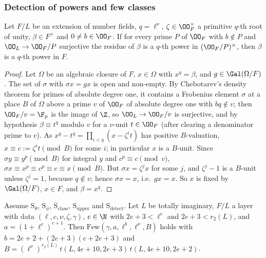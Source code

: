 \subsubsection{Detection of powers and few classes}

\begin{proposition}\label{pf:vwin:sdetect}
Let $F/L$ be an extension of number fields, $q=\ell^\nu$, $\zeta\in\OO_F^\times$ a primitive $q$-th root of unity, $\beta\in F^\times$ and
$0\ne b\in\OO_F$. If for every prime $P$ of $\OO_F$ with $b\notin P$ and $\OO_L\to\OO_F/P$ surjective the residue of $\beta$ is a $q$-th power
in $(\OO_F/P)^\times$, then $\beta$ is a $q$-th power in $F$.
\end{proposition}

\begin{proof}
Let $\Omega$ be an algebraic closure of $F$, $x\in\Omega$ with $x^q=\beta$, and $g\in\Gal(\Omega/F)$. The set of $\sigma$ with
$\sigma x=gx$ is open and non-empty. By Chebotarev's density theorem for primes of absolute degree one, it contains a Frobenius
element $\sigma$ at a place $B$ of $\Omega$ above a prime $v$ of $\OO_F$ of absolute degree one with $bq\notin v$; then $\OO_F/v=\F_p$
is the image of $\Z$, so $\OO_L\to\OO_F/v$ is surjective, and by hypothesis $\beta\equiv t^q$ modulo $v$ for a $v$-unit $t\in\OO_F$
(after clearing a denominator prime to $v$). As $x^q-t^q=\prod_{i<q}(x-\zeta^it)$ has positive $B$-valuation, $x\equiv c:=\zeta^it\pmod B$
for some $i$; in particular $x$ is a $B$-unit. Since $\sigma y\equiv y^p\pmod B$ for integral $y$ and $c^p\equiv c\pmod v$,
$\sigma x\equiv x^p\equiv c^p\equiv c\equiv x\pmod B$. But $\sigma x=\zeta^jx$ for some $j$, and $\zeta^j-1$ is a $B$-unit unless $\zeta^j=1$,
because $q\notin v$; hence $\sigma x=x$, i.e.\ $gx=x$. So $x$ is fixed by $\Gal(\Omega/F)$, $x\in F$, and $\beta=x^q$.
\end{proof}

\begin{proposition}\label{pf:vwin:sfew}
Assume $\mathrm S_\theta$, $\mathrm S_\phi$, $\mathrm S_{\mathrm{class}}$, $\mathrm S_{\mathrm{upper}}$ and $\mathrm S_{\mathrm{detect}}$. Let
$L$ be totally imaginary, $F/L$ a layer with data $(\ell,c,\nu,\zeta,\gamma)$, $e\in\N$ with $2e+3<\ell^c$ and $2e+3<r_2(L)$, and
$a=(1+\ell^c)^{e+1}$. Then $\mathrm{Few}(\gamma,a,\ell^{b},\ell^\nu,B)$ holds with $b=2e+2+(2e+3)(c+2e+3)$ and
$B=(\ell^\nu)^{r_2(L)}\,t(L,4e+10,2e+3)\,t(L,4e+10,2e+2)$.
\end{proposition}

